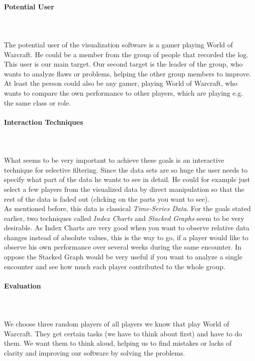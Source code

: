 \documentclass{scrartcl}
\begin{document}
\paragraph{Potential User}
\hfill \\ \hfill \\
The potential user of the visualization software is a gamer playing World of Warcraft. He could be a member from the group of people that recorded the log. This user is our main target. Our second target is the leader of the group, who wants to analyze flaws or problems, helping the other group members to improve. At least the person could also be any gamer, playing World of Warcraft, who wants to compare the own performance to other players, which are playing e.g. the same class or role. 

\paragraph{Interaction Techniques}
\hfill \\ \hfill \\
What seems to be very important to achieve these goals is an interactive technique for selective filtering. Since the data sets are so huge the user needs to specify what part of the data he wants to see in detail. He could for example just select a few players from the visualized data by direct manipulation so that the rest of the data is faded out (clicking on the parts you want to see).\\
As mentioned before, this data is classical \emph{Time-Series Data}. For the goals stated earlier, two techniques called \emph{Index Charts} and \emph{Stacked Graphs} seem to be very desirable. As Index Charts are very good when you want to observe relative data changes instead of absolute values, this is the way to go, if a player would like to observe his own performance over several weeks during the same encounter. In oppose the Stacked Graph would be very useful if you want to analyze a single encounter and see how much each player contributed to the whole group.

\paragraph{Evaluation}
\hfill \\ \hfill \\
We choose three random players of all players we know that play World of Warcraft. They get certain tasks (we have to think about first) and have to do them. We want them to think aloud, helping us to find mistakes or lacks of clarity and improving our software by solving the problems.
\end{document}
